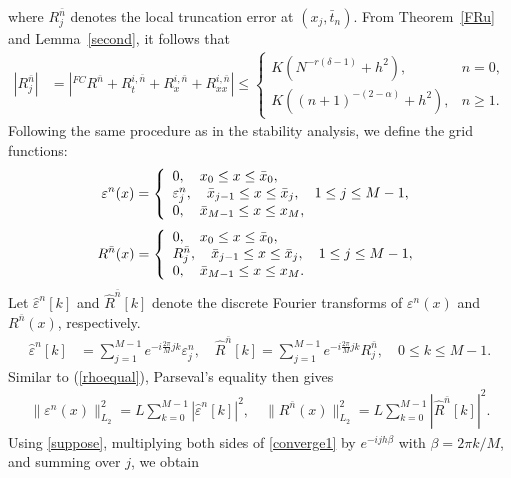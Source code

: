 \documentclass[10pt, reqno]{amsart}
\theoremstyle{remark}
\theoremstyle{definition}
\numberwithin{table}{section}
\begin{document}
where $R_j^{\bar{n}}$ denotes the local truncation error at $(x_j, \bar{t}_n)$. 
From Theorem~\ref{FRu} and Lemma~\ref{second}, it follows that
\begin{align}\label{errorall}
    |R_j^{\bar{n}}|&=|{}^{FC}R^{\bar{n}}+R_t^{i, \bar{n}}+R_x^{i, \bar{n}}+R_{xx}^{i, \bar{n}}|\leq \begin{cases}
K (N^{-r(\delta-1)} + h^2), & n=0, \\
K ((n+1)^{-(2-\alpha)} + h^2), & n \ge 1.
\end{cases}
\end{align}
Following the same procedure as in the stability analysis, we define the grid functions:
 \begin{equation}\notag
\varepsilon^n(x)=\left\{\begin{array}{l}
0,  \quad x_0 \leq x \leq \bar{x}_0,  \\
\varepsilon_j^n,  \quad \bar{x}_{j-1} \leq x \leq \bar{x}_j,  \quad 1 \leq j \leq M-1,  \\
0,  \quad \bar{x}_{M-1} \leq x \leq x_M , 
\end{array}\right.  
\end{equation}
\begin{equation}\notag
R^{\bar{n}}(x)=\left\{\begin{array}{l}
0,  \quad x_0 \leq x \leq \bar{x}_0,  \\
R^{\bar{n}}_j,  \quad \bar{x}_{j-1} \leq x \leq \bar{x}_j,  \quad 1 \leq j \leq M-1,  \\
0,  \quad \bar{x}_{M-1} \leq x \leq x_M . 
\end{array}\right. 
\end{equation}
Let $\hat{\varepsilon}^n[k]$ and $\hat{R}^{\bar{n}}[k]$ denote the discrete Fourier transforms of $\varepsilon^n(x)$ and $R^{\bar{n}}(x)$, respectively.
\begin{align}\label{suppose}
\hat{\varepsilon}^n[k]&=\sum_{j=1}^{M-1} e^{-i \frac{2 \pi}{M} j k} \varepsilon^n_j, \quad 
\hat{R}^{\bar n}[k]=\sum_{j=1}^{M-1} e^{-i \frac{2 \pi}{M} j k} R^{\bar n}_j, \quad 0\le k\le M-1 . 
\end{align}
Similar to (\ref{rhoequal}), Parseval’s equality then gives
\begin{align}
    \|\varepsilon^n(x)\|_{L_2}^2=L\sum_{k=0}^{M-1}|\hat{\varepsilon}^n[k]|^2,\quad \|R^{\bar{n}}(x)\|_{L_2}^2=L\sum_{k=0}^{M-1}|\hat{R}^{\bar{n}}[k]|^2.\label{parseval1}
\end{align}
Using \eqref{suppose}, multiplying both sides of \eqref{converge1} by $e^{-ijh\beta}$ with $\beta = 2\pi k/M$, and summing over $j$, we obtain
\end{document}
